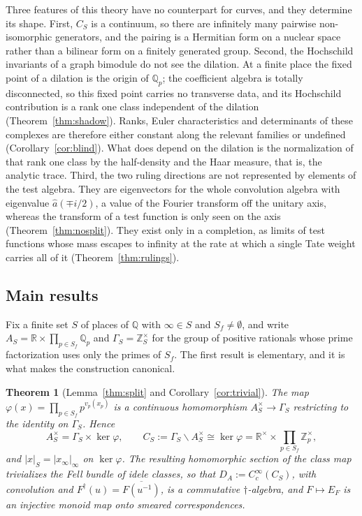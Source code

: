 \documentclass[11pt]{amsart}
\newtheorem{theorem}{Theorem}[section]
\theoremstyle{definition}
\theoremstyle{remark}
\newcommand{\R}{\mathbb R}
\newcommand{\Z}{\mathbb Z}
\newcommand{\Q}{\mathbb Q}
\begin{document}
Three features of this theory have no counterpart for curves, and they
determine its shape.  First, $C_S$ is a continuum, so there are infinitely
many pairwise non-isomorphic generators, and the pairing is a Hermitian form
on a nuclear space rather than a bilinear form on a finitely generated group.
Second, the Hochschild invariants of a graph bimodule do not see the
dilation.  At a finite place the fixed point of a dilation is the origin of
$\Q_p$; the coefficient algebra is totally disconnected, so this fixed point
carries no transverse data, and its Hochschild contribution is a rank one
class independent of the dilation (Theorem~\ref{thm:shadow}).  Ranks, Euler
characteristics and determinants of these complexes are therefore either
constant along the relevant families or undefined
(Corollary~\ref{cor:blind}).  What does depend on the dilation is the
normalization of that rank one class by the half-density and the Haar
measure, that is, the analytic trace.  Third, the two ruling directions are
not represented by elements of the test algebra.  They are eigenvectors for
the whole convolution algebra with eigenvalue $\widehat a(\mp i/2)$, a value
of the Fourier transform off the unitary axis, whereas the transform of a
test function is only seen on the axis (Theorem~\ref{thm:nosplit}).  They
exist only in a completion, as limits of test functions whose mass escapes to
infinity at the rate at which a single Tate weight carries all of it
(Theorem~\ref{thm:rulings}).

\subsection*{Main results}

Fix a finite set $S$ of places of $\Q$ with $\infty\in S$ and $S_f\ne
\emptyset$, and write $A_S=\R\times\prod_{p\in S_f}\Q_p$ and
$\Gamma_S=\Z_S^{\times}$ for the group of positive rationals whose prime
factorization uses only the primes of $S_f$.  The first result is elementary,
and it is what makes the construction canonical.

\begin{theorem}[Lemma~\ref{thm:split} and
Corollary~\ref{cor:trivial}]\label{thm:introA}
The map $\varphi(x)=\prod_{p\in S_f}p^{v_p(x_p)}$ is a continuous
homomorphism $A_S^{\times}\to\Gamma_S$ restricting to the identity on
$\Gamma_S$.  Hence
\[
A_S^{\times}=\Gamma_S\times\ker\varphi,\qquad
C_S:=\Gamma_S\backslash A_S^{\times}\cong\ker\varphi=
\R^{\times}\times\prod_{p\in S_f}\Z_p^{\times},
\]
and $|x|_S=|x_{\infty}|_{\infty}$ on $\ker\varphi$.  The resulting
homomorphic section of the class map trivializes the Fell bundle of idele
classes, so that $D_A:=C_c^{\infty}(C_S)$, with convolution and
$F^{\dagger}(u)=\overline{F(u^{-1})}$, is a commutative $\dagger$-algebra,
and $F\mapsto E_F$ is an injective monoid map onto smeared correspondences.
\end{theorem}
\end{document}
